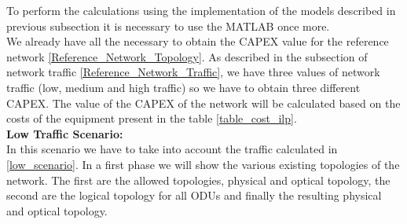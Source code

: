 To perform the calculations using the implementation of the models described in previous subsection it is necessary to use the MATLAB once more. \\
We already have all the necessary to obtain the CAPEX value for the reference network \ref{Reference_Network_Topology}. As described in the subsection of network traffic \ref{Reference_Network_Traffic}, we have three values of network traffic (low, medium and high traffic) so we have to obtain three different CAPEX.
The value of the CAPEX of the network will be calculated based on the costs of the equipment present in the table \ref{table_cost_ilp}.\\

\vspace{15pt}
\textbf{Low Traffic Scenario:}\\

In this scenario we have to take into account the traffic calculated in \ref{low_scenario}. In a first phase we will show the various existing topologies of the network. The first are the allowed topologies, physical and optical topology, the second are the logical topology for all ODUs and finally the resulting physical and optical topology.\\

